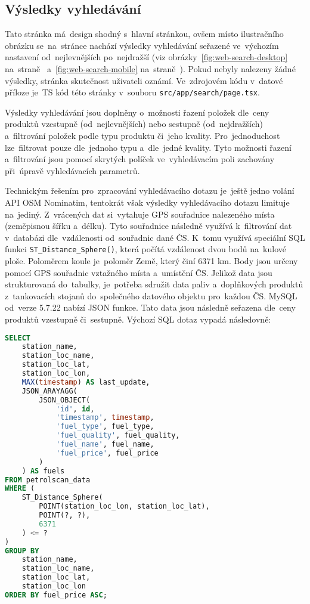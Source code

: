 \subsection{Výsledky vyhledávání}
\label{sec:search-results}

Tato stránka má~design shodný s~hlavní stránkou, ovšem místo ilustračního
obrázku se~na~stránce nachází výsledky vyhledávání seřazené ve~výchozím
nastavení od~nejlevnějších po~nejdražší
(viz obrázky~\ref{fig:web-search-desktop}
na~straně~\pageref{fig:web-search-desktop}
a~\ref{fig:web-search-mobile} na~straně~\pageref{fig:web-search-mobile}).
Pokud nebyly nalezeny žádné výsledky, stránka skutečnost uživateli
oznámí. Ve~zdrojovém kódu v~datové příloze je~TS kód této stránky v~souboru
\texttt{src/app/search/page.tsx}.

Výsledky vyhledávání jsou doplněny o~možnosti řazení položek dle~ceny produktů
vzestupně (od~nejlevnějších) nebo sestupně (od~nejdražších) a~filtrování
položek podle typu produktu či~jeho kvality. Pro~jednoduchost lze~filtrovat
pouze dle~jednoho typu a~dle~jedné kvality. Tyto možnosti řazení a~filtrování
jsou pomocí skrytých políček ve~vyhledávacím poli zachovány při~úpravě
vyhledávacích parametrů.

Technickým řešením pro~zpracování vyhledávacího dotazu je~ještě jedno volání
API OSM Nominatim, tentokrát však výsledky vyhledávacího dotazu limituje
na~jediný. Z~vrácených dat si~vytahuje GPS souřadnice nalezeného místa
(zeměpisnou šířku a~délku). Tyto souřadnice následně využívá k~filtrování
dat v~databázi dle~vzdálenosti od~souřadnic dané ČS. K~tomu využívá speciální
SQL funkci \texttt{ST\_Distance\_Sphere()}, která počítá vzdálenost dvou bodů
na~kulové ploše. Poloměrem koule je~poloměr Země, který činí 6371 km.
Body jsou určeny pomocí GPS souřadnic vztažného místa a~umístění ČS. Jelikož
data jsou strukturovaná do~tabulky, je~potřeba sdružit data paliv a~doplňkových
produktů z~tankovacích stojanů do~společného datového objektu pro~každou ČS.
MySQL od~verze 5.7.22 nabízí JSON funkce. Tato data jsou následně seřazena
dle~ceny produktů vzestupně či~sestupně. Výchozí SQL dotaz vypadá následovně:
\bigskip

\begin{lstlisting}[label=lst:default-sql-query,caption={SQL dotaz srovnávače cen},language=sql]
SELECT
    station_name,
    station_loc_name,
    station_loc_lat,
    station_loc_lon,
    MAX(timestamp) AS last_update,
    JSON_ARAYAGG(
        JSON_OBJECT(
            'id', id,
            'timestamp', timestamp,
            'fuel_type', fuel_type,
            'fuel_quality', fuel_quality,
            'fuel_name', fuel_name,
            'fuel_price', fuel_price
        )
    ) AS fuels
FROM petrolscan_data
WHERE (
    ST_Distance_Sphere(
        POINT(station_loc_lon, station_loc_lat),
        POINT(?, ?),
        6371
    ) <= ?
)
GROUP BY
    station_name,
    station_loc_name,
    station_loc_lat,
    station_loc_lon
ORDER BY fuel_price ASC;
\end{lstlisting}

